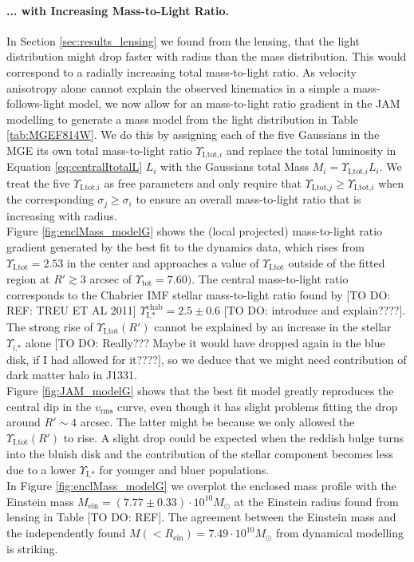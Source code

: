 \paragraph{... with Increasing Mass-to-Light Ratio.} In Section \ref{sec:results_lensing} we found from the lensing, that the light distribution might drop faster with radius than the mass distribution. This would correspond to a radially increasing total mass-to-light ratio. As velocity anisotropy alone cannot explain the observed kinematics in a simple a mass-follows-light model, we now allow for an mass-to-light ratio gradient in the JAM modelling to generate a mass model from the light distribution in Table \ref{tab:MGEF814W}. We do this by assigning each of the five Gaussians in the MGE its own total mass-to-light ratio $\Upsilon_{\text{I,tot,}i}$ and replace the total luminosity in Equation \ref{eq:centralItotalL} $L_i$ with the Gaussians total Mass $M_i = \Upsilon_{\text{I,tot,}i} L_i$. We treat the five $\Upsilon_{\text{I,tot,}i}$ as free parameters and only require that $\Upsilon_{\text{I,tot,}j} \geq \Upsilon_{\text{I,tot,}i}$ when the corresponding $\sigma_j \geq \sigma_i$ to ensure an overall mass-to-light ratio that is increasing with radius.
\\Figure \ref{fig:enclMass_modelG} shows the (local projected) mass-to-light ratio gradient generated by the best fit to the dynamics data, which rises from $\Upsilon_\text{I,tot} = 2.53$ in the center and approaches a value of $\Upsilon_\text{I,tot}$ outside of the fitted region at $R'\gtrsim 3$ arcsec of $\Upsilon_\text{tot} = 7.60)$. The central mass-to-light ratio corresponds to the Chabrier IMF stellar mass-to-light ratio found by [TO DO: REF: TREU ET AL 2011] $\Upsilon_\text{I,*}^\text{chab} = 2.5 \pm 0.6$ [TO DO: introduce and explain????]. The strong rise of $\Upsilon_\text{I,tot}(R')$ cannot be explained by an increase in the stellar $\Upsilon_\text{i,*}$ alone [TO DO: Really??? Maybe it would have dropped again in the blue disk, if I had allowed for it????], so we deduce that we might need  contribution of dark matter halo in J1331.
\\Figure \ref{fig:JAM_modelG} shows that the best fit model greatly reproduces the central dip in the $v_\text{rms}$ curve, even though it has slight problems fitting the drop around $R' \sim 4$ arcsec. The latter might be because we only allowed the $\Upsilon_\text{I,tot}(R')$ to rise. A slight drop could be expected when the reddish bulge turns into the bluish disk and the contribution of the stellar component becomes less due to a lower $\Upsilon_\text{I,*}$ for younger and bluer populations.
\\In Figure \ref{fig:enclMass_modelG} we overplot the enclosed mass profile with the Einstein mass $M_\text{ein} = (7.77 \pm 0.33) \cdot 10^{10} M_\odot$ at the Einstein radius found from lensing in Table [TO DO: REF]. The agreement between the Einstein mass and the independently found $M(<R_\text{ein}) = 7.49 \cdot 10^{10} M_\odot$ from dynamical modelling is striking.


